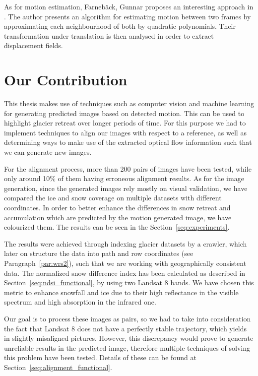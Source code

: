 \documentclass[12pt, a4paper]{report}
\begin{document}
	\par As for motion estimation, Farneb{\"a}ck, Gunnar proposes an interesting approach in \cite{GUNNAR2013}. The author presents an algorithm for estimating motion between two frames by approximating each neighbourhood of both by quadratic polynomials. Their transformation under translation is then analysed in order to extract displacement fields.

	\section{Our Contribution}
	
	\par This thesis makes use of techniques such as computer vision and machine learning for generating predicted images based on detected motion. This can be used to highlight glacier retreat over longer periods of time. For this purpose we had to implement techniques to align our images with respect to a reference, as well as determining ways to make use of the extracted optical flow information such that we can generate new images.

	\par For the alignment process, more than 200 pairs of images have been tested, while only around 10\% of them having erroneous alignment results. As for the image generation, since the generated images rely mostly on visual validation, we have compared the ice and snow coverage on multiple datasets with different coordinates. In order to better enhance the differences in snow retreat and accumulation which are predicted by the motion generated image, we have colourized them. The results can be seen in the Section~\ref{seq:experiments}. 
	
	\par The results were achieved through indexing glacier datasets by a crawler, which later on structure the data into path and row coordinates (see Paragraph~\ref{par:wrs2}), such that we are working with geographically consistent data. The normalized snow difference index has been calculated as described in Section~\ref{seq:ndsi_functional}, by using two Landsat 8 bands. We have chosen this metric to enhance snowfall and ice due to their high reflectance in the visible spectrum and high absorption in the infrared one.
	
	\par Our goal is to process these images as pairs, so we had to take into consideration the fact that Landsat 8 does not have a perfectly stable trajectory, which yields in slightly misaligned pictures. However, this discrepancy would prove to generate unreliable results in the predicted image, therefore multiple techniques of solving this problem have been tested. Details of these can be found at Section~\ref{seq:alignment_functional}.
\end{document}
